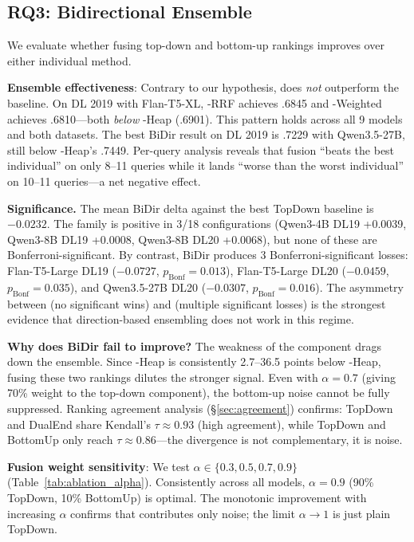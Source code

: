 \FloatBarrier

\subsection{RQ3: Bidirectional Ensemble}
\label{sec:rq3}

We evaluate whether fusing top-down and bottom-up rankings improves over either individual method.

\textbf{Ensemble effectiveness}: Contrary to our hypothesis, \bidir{} does \emph{not} outperform the \topdown{} baseline. On DL 2019 with Flan-T5-XL, \bidir{}-RRF achieves .6845 and \bidir{}-Weighted achieves .6810---both \emph{below} \topdown{}-Heap (.6901). This pattern holds across all 9 models and both datasets. The best BiDir result on DL 2019 is .7229 with Qwen3.5-27B, still below \topdown{}-Heap's .7449. Per-query analysis reveals that fusion ``beats the best individual'' on only 8--11 queries while it lands ``worse than the worst individual'' on 10--11 queries---a net negative effect.

\textbf{Significance.} The mean BiDir delta against the best TopDown baseline is $-0.0232$. The family is positive in 3/18 configurations (Qwen3-4B DL19 +0.0039, Qwen3-8B DL19 +0.0008, Qwen3-8B DL20 +0.0068), but none of these are Bonferroni-significant. By contrast, BiDir produces 3 Bonferroni-significant losses: Flan-T5-Large DL19 ($-0.0727$, $p_\text{Bonf}=0.013$), Flan-T5-Large DL20 ($-0.0459$, $p_\text{Bonf}=0.035$), and Qwen3.5-27B DL20 ($-0.0307$, $p_\text{Bonf}=0.016$). The asymmetry between (no significant wins) and (multiple significant losses) is the strongest evidence that direction-based ensembling does not work in this regime.

\textbf{Why does BiDir fail to improve?} The weakness of the \bottomup{} component drags down the ensemble. Since \bottomup{}-Heap is consistently 2.7--36.5 points below \topdown{}-Heap, fusing these two rankings dilutes the stronger signal. Even with $\alpha=0.7$ (giving 70\% weight to the top-down component), the bottom-up noise cannot be fully suppressed. Ranking agreement analysis (\S\ref{sec:agreement}) confirms: TopDown and DualEnd share Kendall's $\tau \approx 0.93$ (high agreement), while TopDown and BottomUp only reach $\tau \approx 0.86$---the divergence is not complementary, it is noise.

\textbf{Fusion weight sensitivity}: We test $\alpha \in \{0.3, 0.5, 0.7, 0.9\}$ (Table~\ref{tab:ablation_alpha}). Consistently across all models, $\alpha=0.9$ (90\% TopDown, 10\% BottomUp) is optimal. The monotonic improvement with increasing $\alpha$ confirms that \bottomup{} contributes only noise; the limit $\alpha\to 1$ is just plain TopDown.

